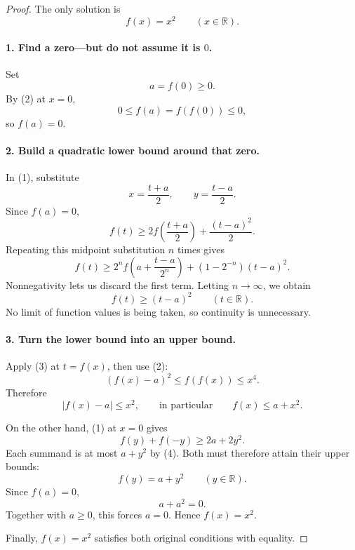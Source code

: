 
\begin{dlsummary}[title={\bfseries Solution 43. The Moving Zero},breakable]

\begin{proof}
The only solution is
\[
\boxed{f(x)=x^2\qquad(x\in\mathbb R).}
\]

\paragraph{1. Find a zero—but do not assume it is \(0\).}

Set
\[
a=f(0)\ge0.
\]
By (2) at \(x=0\),
\[
0\le f(a)=f(f(0))\le0,
\]
so \(f(a)=0\).

\paragraph{2. Build a quadratic lower bound around that zero.}

In (1), substitute
\[
x=\frac{t+a}{2},\qquad y=\frac{t-a}{2}.
\]
Since \(f(a)=0\),
\[
f(t)\ge 2f\!\left(\frac{t+a}{2}\right)+\frac{(t-a)^2}{2}.
\]
Repeating this midpoint substitution \(n\) times gives
\[
f(t)\ge
2^n f\!\left(a+\frac{t-a}{2^n}\right)
+(1-2^{-n})(t-a)^2.
\]
Nonnegativity lets us discard the first term. Letting \(n\to\infty\), we obtain
\[
\boxed{f(t)\ge(t-a)^2\qquad(t\in\mathbb R).} \tag{3}
\]
No limit of function values is being taken, so continuity is unnecessary.

\paragraph{3. Turn the lower bound into an upper bound.}

Apply (3) at \(t=f(x)\), then use (2):
\[
(f(x)-a)^2\le f(f(x))\le x^4.
\]
Therefore
\[
|f(x)-a|\le x^2,
\qquad\text{in particular}\qquad
f(x)\le a+x^2. \tag{4}
\]

On the other hand, (1) at \(x=0\) gives
\[
f(y)+f(-y)\ge2a+2y^2.
\]
Each summand is at most \(a+y^2\) by (4). Both must therefore attain their upper bounds:
\[
f(y)=a+y^2\qquad(y\in\mathbb R).
\]
Since \(f(a)=0\),
\[
a+a^2=0.
\]
Together with \(a\ge0\), this forces \(a=0\). Hence \(f(x)=x^2\).

Finally, \(f(x)=x^2\) satisfies both original conditions with equality.
\end{proof}
\end{dlsummary}

